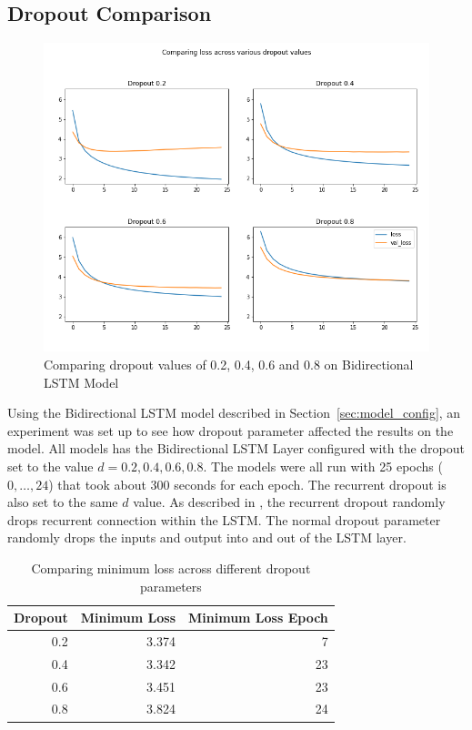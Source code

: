 \documentclass[11pt,a4paper]{article}
\begin{document}
\subsection{Dropout Comparison}

\begin{figure}[h!]
\centering
\includegraphics[scale=0.65]{dropout_compare_plot.png}
\caption{Comparing dropout values of 0.2, 0.4, 0.6 and 0.8 on Bidirectional LSTM Model}
\label{fig:dropout_compare_loss}
\end{figure}

Using the Bidirectional LSTM model described in Section~\ref{sec:model_config}, an experiment was set up to see how dropout parameter affected the results on the model.
All models has the Bidirectional LSTM Layer configured with the dropout set to the value $d = 0.2, 0.4, 0.6, 0.8$.
The models were all run with 25 epochs ($0,\ldots,24$) that took about 300 seconds for each epoch.
The recurrent dropout is also set to the same $d$ value.
As described in \cite{recurrent_dropout}, the recurrent dropout randomly drops recurrent connection within the LSTM.
The normal dropout parameter randomly drops the inputs and output into and out of the LSTM layer.

\begin{table}[h!]
    \centering
    \begin{tabular}{rrr}
    \toprule
     Dropout &  Minimum Loss &  Minimum Loss Epoch \\
    \midrule
         0.2 &         3.374 &                   7 \\
         0.4 &         3.342 &                  23 \\
         0.6 &         3.451 &                  23 \\
         0.8 &         3.824 &                  24 \\
    \bottomrule
    \end{tabular}
    \caption{Comparing minimum loss across different dropout parameters} \label{tab:dropout_loss}
\end{table}
\end{document}
